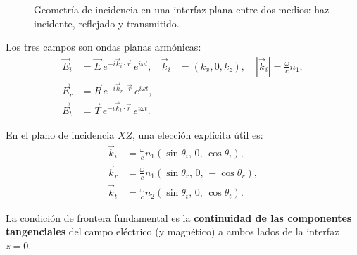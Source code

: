 \documentclass[12pt, a4paper]{article}
\theoremstyle{plain}
\theoremstyle{definition}
\theoremstyle{remark}
\newcommand{\ve}[1]{\vec{#1}}
\newcommand{\uvec}[1]{\hat{#1}}
\begin{document}
\begin{figure}[H]
  \centering
  \caption{Geometría de incidencia en una interfaz plana entre dos medios:
           haz incidente, reflejado y transmitido.}
  \label{fig:interfaz_geo}
\end{figure}

Los tres campos son ondas planas armónicas:
\begin{align}
  \ve{E}_i &= \ve{E}\, e^{-i\ve{k}_i \cdot \ve{r}}\, e^{i\omega t},
  & \ve{k}_i &= (k_x, 0, k_z),\quad |\ve{k}_i| = \frac{\omega}{c}n_1, \\
  \ve{E}_r &= \ve{R}\, e^{-i\ve{k}_r \cdot \ve{r}}\, e^{i\omega t}, \\
  \ve{E}_t &= \ve{T}\, e^{-i\ve{k}_t \cdot \ve{r}}\, e^{i\omega t}.
\end{align}

En el plano de incidencia $XZ$, una elección explícita útil es:
\begin{align}
  \ve{k}_i &= \frac{\omega}{c}n_1\left(\sin\theta_i,\,0,\,\cos\theta_i\right), \\
  \ve{k}_r &= \frac{\omega}{c}n_1\left(\sin\theta_r,\,0,\,-\cos\theta_r\right), \\
  \ve{k}_t &= \frac{\omega}{c}n_2\left(\sin\theta_t,\,0,\,\cos\theta_t\right).
\end{align}

La condición de frontera fundamental es la \textbf{continuidad de las
componentes tangenciales} del campo eléctrico (y magnético) a ambos lados
de la interfaz $z=0$.
\end{document}
